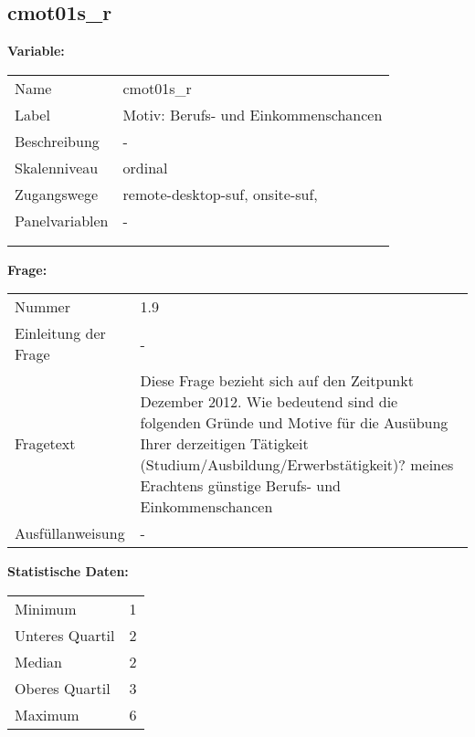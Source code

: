 	
	
	\subsection{cmot01s\_r}
	\label{subSection:cmot01s_r}

	\noindent\textbf{Variable:}\\
		\begin{tabular}{lL{11.3cm}}
			\label{tableVariable:cmot01s_r}
			Name & cmot01s\_r \\
			Label & Motiv: Berufs- und Einkommenschancen \\
			Beschreibung & - \\
			Skalenniveau & ordinal \\
			Zugangswege &
				remote-desktop-suf,
				onsite-suf,
 \\
			Panelvariablen & -
			 \\
			 \\
 \\
		\end{tabular}

		\vspace*{1 cm}
		\noindent\textbf{Frage:}\\
		\begin{tabular}{lL{11.3cm}}
			\label{tableQuestion:cmot01s_r}
			Nummer & 1.9 \\
			Einleitung der Frage & - \\
			Fragetext & Diese Frage bezieht sich auf den Zeitpunkt Dezember 2012. Wie bedeutend sind die folgenden Gründe und Motive für die Ausübung Ihrer derzeitigen Tätigkeit (Studium/Ausbildung/Erwerbstätigkeit)?
meines Erachtens günstige Berufs- und Einkommenschancen \\
			Ausfüllanweisung & - \\
		\end{tabular}


		\vspace*{1 cm}
		\noindent\textbf{Statistische Daten:}\\
			\begin{tabular}{ll}
				\label{tableStatistics:cmot01s_r}
					Minimum & 1 \\
					Unteres Quartil & 2 \\
					Median & 2 \\
					Oberes Quartil & 3 \\
					Maximum & 6 \\
			\end{tabular}



